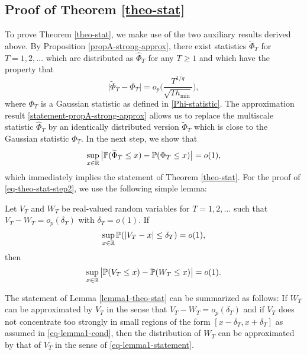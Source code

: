 \documentclass[a4paper,12pt]{article}
\numberwithin{equation}{section}
\begin{document}
\newpage
\subsection*{Proof of Theorem \ref{theo-stat}}


To prove Theorem \ref{theo-stat}, we make use of the two auxiliary results derived above. By Proposition \ref{propA-strong-approx}, there exist statistics $\widetilde{\Phi}_T$ for $T = 1,2,\ldots$ which are distributed as $\widehat{\Phi}_T$ for any $T \ge 1$ and which have the property that 
\begin{equation}\label{statement-propA-strong-approx}
\big| \widetilde{\Phi}_T - \Phi_T \big| = o_p \Big( \frac{T^{1/q}}{\sqrt{T h_{\min}}} \Big), 
\end{equation}
where $\Phi_T$ is a Gaussian statistic as defined in \eqref{Phi-statistic}. The approximation result \eqref{statement-propA-strong-approx} allows us to replace the multiscale statistic $\widehat{\Phi}_T$ by an identically distributed version $\widetilde{\Phi}_T$ which is close to the Gaussian statistic $\Phi_T$. In the next step, we show that  
\begin{equation}\label{eq-theo-stat-step2}
\sup_{x \in \mathbb{R}} \big| \mathbb{P}(\widetilde{\Phi}_T \le x) - \mathbb{P}(\Phi_T \le x) \big| = o(1), 
\end{equation}
which immediately implies the statement of Theorem \ref{theo-stat}. For the proof of \eqref{eq-theo-stat-step2}, we use the following simple lemma: 
\begin{lemmaA}\label{lemma1-theo-stat}
Let $V_T$ and $W_T$ be real-valued random variables for $T = 1,2,\ldots$ such that $V_T - W_T = o_p(\delta_T)$ with $\delta_T = o(1)$. If 
\begin{equation}\label{eq-lemma1-cond}
\sup_{x \in \mathbb{R}} \mathbb{P}(|V_T - x| \le \delta_T) = o(1), 
\end{equation}
then 
\begin{equation}\label{eq-lemma1-statement}
\sup_{x \in \mathbb{R}} \big| \mathbb{P}(V_T \le x) - \mathbb{P}(W_T \le x) \big| = o(1). 
\end{equation}
\end{lemmaA}
The statement of Lemma \ref{lemma1-theo-stat} can be summarized as follows: If $W_T$ can be approximated by $V_T$ in the sense that $V_T - W_T = o_p(\delta_T)$ and if $V_T$ does not concentrate too strongly in small regions of the form $[x - \delta_T,x+\delta_T]$ as assumed in \eqref{eq-lemma1-cond}, then the distribution of $W_T$ can be approximated by that of $V_T$ in the sense of \eqref{eq-lemma1-statement}.
\end{document}
